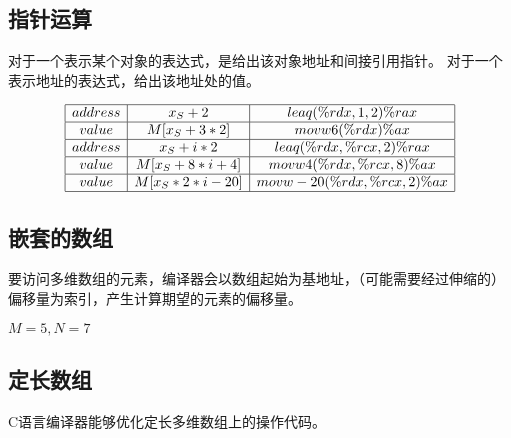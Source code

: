 {    \subsection{指针运算}
    {
        对于一个表示某个对象的表达式，是给出该对象地址和间接引用指针。
        对于一个表示地址的表达式，给出该地址处的值。

        \begin{practicec}
            \begin{table}[htb]
                \centering

                \[
                    \begin{array}{|c|c|c|}
                        \hline
                        address & x_S + 2 & leaq (\%rdx, 1, 2) \%rax \\
                        \hline
                        value & M[x_S + 3 * 2] & movw 6(\%rdx) \%ax \\
                        \hline
                        address & x_S + i * 2 & leaq (\%rdx, \%rcx, 2) \%rax \\
                        \hline
                        value & M[x_S + 8 * i + 4] & movw 4(\%rdx, \%rcx, 8) \%ax \\
                        \hline
                        value & M[x_S * 2 * i - 20] & movw -20(\%rdx, \%rcx, 2) \%ax \\
                        \hline
                    \end{array}
                \]
            \end{table}
        \end{practicec}
    }

    \subsection{嵌套的数组}
    {
        要访问多维数组的元素，编译器会以数组起始为基地址，（可能需要经过伸缩的）偏移量为索引，产生计算期望的元素的偏移量。

        \begin{practicec}
            $M = 5, N = 7$
        \end{practicec}
    }

    \subsection{定长数组}
    {
        C语言编译器能够优化定长多维数组上的操作代码。

}}
